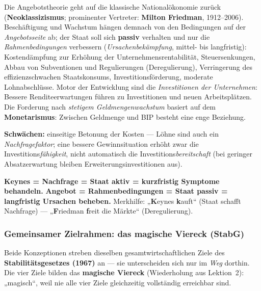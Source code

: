 \documentclass[11pt, a4paper]{article}
\begin{document}
Die Angebotstheorie geht auf die klassische Nationalökonomie zurück
(\textbf{Neoklassizismus}; prominenter Vertreter: \textbf{Milton Friedman}, 1912--2006).
Beschäftigung und Wachstum hängen demnach von den Bedingungen auf der
\emph{Angebotsseite} ab; der Staat soll sich \textbf{passiv} verhalten und nur die
\emph{Rahmenbedingungen} verbessern (\emph{Ursachenbekämpfung}, mittel- bis langfristig):
Kostendämpfung zur Erhöhung der Unternehmensrentabilität, Steuersenkungen, Abbau von
Subventionen und Regulierungen (Deregulierung), Verringerung des effizienzschwachen
Staatskonsums, Investitionsförderung, moderate Lohnabschlüsse. Motor der Entwicklung sind
die \emph{Investitionen der Unternehmen}: Bessere Renditeerwartungen führen zu
Investitionen und neuen Arbeitsplätzen. Die Forderung nach \emph{stetigem
Geldmengenwachstum} basiert auf dem \textbf{Monetarismus}: Zwischen Geldmenge und BIP
besteht eine enge Beziehung.

\textbf{Schwächen:} einseitige Betonung der Kosten --- Löhne sind auch ein
\emph{Nachfragefaktor}; eine bessere Gewinnsituation erhöht zwar die
Investitions\emph{fähigkeit}, nicht automatisch die Investitions\emph{bereitschaft} (bei
geringer Absatzerwartung bleiben Erweiterungsinvestitionen aus).

\begin{eselsbruecke}
\textbf{Keynes = Nachfrage = Staat aktiv = kurzfristig Symptome behandeln.}
\textbf{Angebot = Rahmenbedingungen = Staat passiv = langfristig Ursachen beheben.}
Merkhilfe: „\textbf{K}eynes \textbf{k}auft`` (Staat schafft Nachfrage) ---
„\textbf{F}riedman \textbf{f}reit die Märkte`` (Deregulierung).
\end{eselsbruecke}

\subsubsection{Gemeinsamer Zielrahmen: das magische Viereck (StabG)}

Beide Konzeptionen streben dieselben gesamtwirtschaftlichen Ziele des
\textbf{Stabilitätsgesetzes (1967)} an --- sie unterscheiden sich nur im \emph{Weg}
dorthin. Die vier Ziele bilden das \textbf{magische Viereck} (Wiederholung aus
Lektion~2): „magisch``, weil nie alle vier Ziele gleichzeitig vollständig erreichbar
sind.
\end{document}
